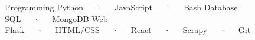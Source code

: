 

\begin{cvtechnicals}
  \cvtechnical %
    {Programming} %
    {Python~~~·~~~JavaScript~~~·~~~Bash} %
    {Database} %
    {SQL~~~·~~~MongoDB} %
    {Web} %
    {Flask~~~·~~~HTML/CSS~~~·~~~React~~~·~~~Scrapy~~~·~~~Git} %
\end{cvtechnicals}
